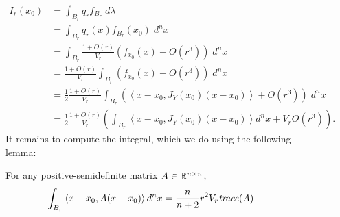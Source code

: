 \documentclass[english]{scrartcl}
\begin{document}
\begin{figure}
	\begin{align*}
		I_r(x_0) &= \int_{B_r} q_r f_{B_r} \; d\lambda \\ 
		&= \int_{B_r} q_r(x) f_{B_r}(x_0)\; d^n x \\
		&= \int_{B_r} \frac{1 + O(r)}{V_r} \left(f_{x_0}(x) + O(r^3)\right) \; d^n x \\
		&= \frac{1 + O(r)}{V_r} \int_{B_r} \left(f_{x_0}(x) + O(r^3)\right) \; d^n x \\
		&= \frac{1}{2}\frac{1 + O(r)}{V_r} \int_{B_r} \left( \left<x - x_0, J_Y(x_0)(x - x_0)\right>  + O(r^3)\right) \; d^n x \\ 
		&= \frac{1}{2}\frac{1 + O(r)}{V_r} \left(\int_{B_r}  \left<x - x_0, J_Y(x_0)(x - x_0)\right> d^n x + V_rO(r^3)\right). 
	\end{align*}
	It remains to compute the integral, which we do using the following lemma: 

	\begin{lm} For any positive-semidefinite matrix $A \in \mathbb{R}^{n\times n}$, 
			$$\int_{B_r} \left< x - x_0, A(x-x_0) \right> d^n x = \frac{n}{n+2} r^{2} V_r \text{\emph{trace}} (A)$$
	\end{lm}
		

\end{figure}
\end{document}
